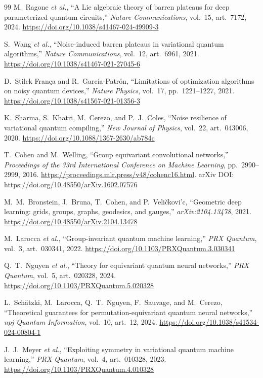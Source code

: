 \documentclass{article}
\begin{document}
\begin{thebibliography}{99}
M.~Ragone \emph{et al.}, ``A Lie algebraic theory of barren plateaus for deep parameterized quantum circuits,'' \emph{Nature Communications}, vol.~15, art.~7172, 2024. \url{https://doi.org/10.1038/s41467-024-49909-3}

S.~Wang \emph{et al.}, ``Noise-induced barren plateaus in variational quantum algorithms,'' \emph{Nature Communications}, vol.~12, art.~6961, 2021. \url{https://doi.org/10.1038/s41467-021-27045-6}

D.~Stilck Fran\c{c}a and R.~Garc\'ia-Patr\'on, ``Limitations of optimization algorithms on noisy quantum devices,'' \emph{Nature Physics}, vol.~17, pp.~1221--1227, 2021. \url{https://doi.org/10.1038/s41567-021-01356-3}

K.~Sharma, S.~Khatri, M.~Cerezo, and P.~J.~Coles, ``Noise resilience of variational quantum compiling,'' \emph{New Journal of Physics}, vol.~22, art.~043006, 2020. \url{https://doi.org/10.1088/1367-2630/ab784c}

T.~Cohen and M.~Welling, ``Group equivariant convolutional networks,'' \emph{Proceedings of the 33rd International Conference on Machine Learning}, pp.~2990--2999, 2016. \url{https://proceedings.mlr.press/v48/cohenc16.html}. arXiv DOI: \url{https://doi.org/10.48550/arXiv.1602.07576}

M.~M.~Bronstein, J.~Bruna, T.~Cohen, and P.~Veli\v{c}kovi'c, ``Geometric deep learning: grids, groups, graphs, geodesics, and gauges,'' \emph{arXiv:2104.13478}, 2021. \url{https://doi.org/10.48550/arXiv.2104.13478}

M.~Larocca \emph{et al.}, ``Group-invariant quantum machine learning,'' \emph{PRX Quantum}, vol.~3, art.~030341, 2022. \url{https://doi.org/10.1103/PRXQuantum.3.030341}

Q.~T.~Nguyen \emph{et al.}, ``Theory for equivariant quantum neural networks,'' \emph{PRX Quantum}, vol.~5, art.~020328, 2024. \url{https://doi.org/10.1103/PRXQuantum.5.020328}

L.~Sch\"atzki, M.~Larocca, Q.~T.~Nguyen, F.~Sauvage, and M.~Cerezo, ``Theoretical guarantees for permutation-equivariant quantum neural networks,'' \emph{npj Quantum Information}, vol.~10, art.~12, 2024. \url{https://doi.org/10.1038/s41534-024-00804-1}

J.~J.~Meyer \emph{et al.}, ``Exploiting symmetry in variational quantum machine learning,'' \emph{PRX Quantum}, vol.~4, art.~010328, 2023. \url{https://doi.org/10.1103/PRXQuantum.4.010328}


\end{thebibliography}
\end{document}
